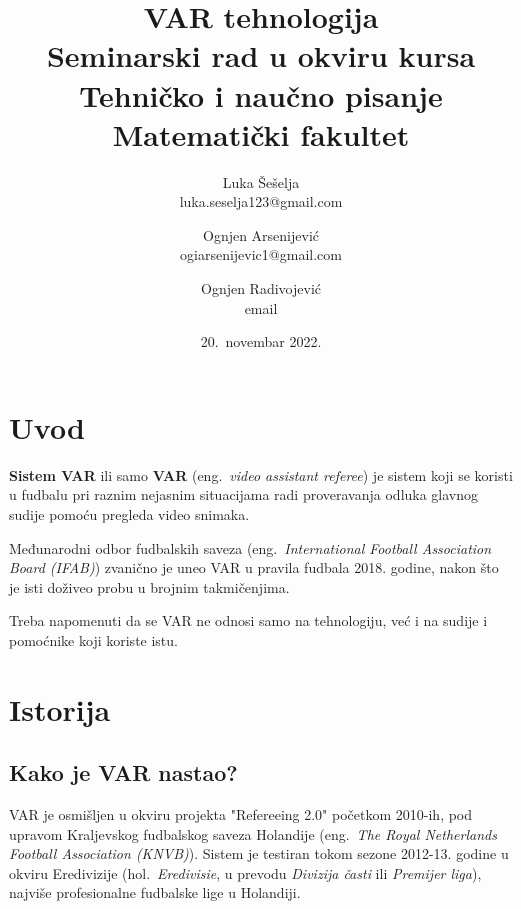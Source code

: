 \documentclass[a4paper]{article}
\begin{document}
\title{VAR tehnologija\\ \small{Seminarski rad u okviru kursa\\Tehničko i naučno pisanje\\ Matematički fakultet}}

\author{Luka Šešelja\\ luka.seselja123@gmail.com \and Ognjen Arsenijević\\ ogiarsenijevic1@gmail.com \and Ognjen Radivojević\\ email}
\date{20.~novembar 2022.}
\maketitle

\begin{abstract}
    
\end{abstract}

\tableofcontents

\newpage

\section{Uvod}
\textbf{Sistem VAR} ili samo \textbf{VAR} (eng.~{\em video assistant referee}) je sistem koji se koristi u fudbalu pri raznim nejasnim situacijama radi proveravanja odluka glavnog sudije pomoću pregleda video snimaka.

Međunarodni odbor fudbalskih saveza (eng.~{\em International Football Association Board (IFAB)}) zvanično je uneo VAR u pravila fudbala 2018. godine, nakon što je isti doživeo probu u brojnim takmičenjima.

Treba napomenuti da se VAR ne odnosi samo na tehnologiju, već i na sudije i pomoćnike koji koriste istu.

\section{Istorija}
\subsection{Kako je VAR nastao?}
VAR je osmišljen u okviru projekta "Refereeing 2.0" početkom 2010-ih, pod upravom Kraljevskog fudbalskog saveza Holandije (eng.~{\em The Royal Netherlands Football Association (KNVB)}). Sistem je testiran tokom sezone 2012-13. godine u okviru Eredivizije (hol.~{\emph{Eredivisie}, u prevodu \emph{Divizija časti} ili \emph{Premijer liga}}), najviše profesionalne fudbalske lige u Holandiji. 
\end{document}

